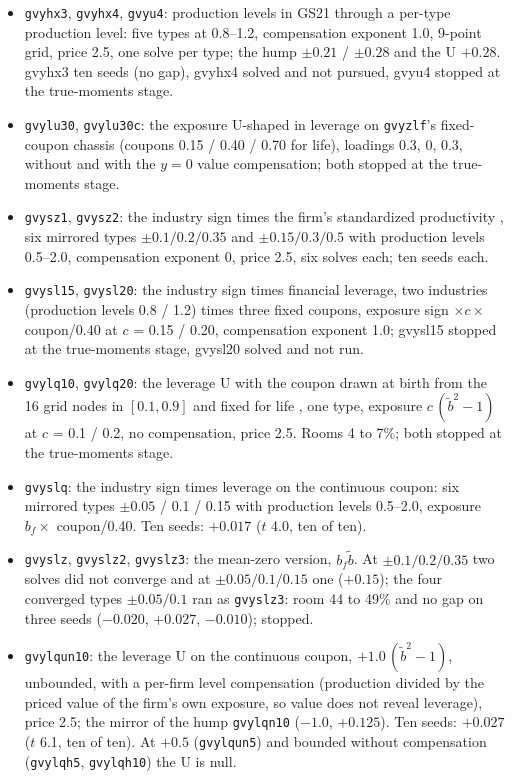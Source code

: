 \documentclass[11pt]{article}
\begin{document}
\begin{itemize}
\item \texttt{gvyhx3}, \texttt{gvyhx4}, \texttt{gvyu4}: production levels in GS21 through a per-type production level: five types at 0.8--1.2, compensation exponent 1.0, 9-point grid, price 2.5, one solve per type; the hump $\pm0.21$ / $\pm0.28$ and the U $+0.28$. gvyhx3 ten seeds (no gap), gvyhx4 solved and not pursued, gvyu4 stopped at the true-moments stage.
\item \texttt{gvylu30}, \texttt{gvylu30c}: the exposure U-shaped in leverage on \texttt{gvyzlf}'s fixed-coupon chassis (coupons 0.15 / 0.40 / 0.70 for life), loadings 0.3, 0, 0.3, without and with the $y = 0$ value compensation; both stopped at the true-moments stage.
\item \texttt{gvysz1}, \texttt{gvysz2}: the industry sign times the firm's standardized productivity , six mirrored types $\pm0.1/0.2/0.35$ and $\pm0.15/0.3/0.5$ with production levels 0.5--2.0, compensation exponent 0, price 2.5, six solves each; ten seeds each.
\item \texttt{gvysl15}, \texttt{gvysl20}: the industry sign times financial leverage, two industries (production levels 0.8 / 1.2) times three fixed coupons, exposure sign $\times c \times$ coupon/0.40 at $c$ = 0.15 / 0.20, compensation exponent 1.0; gvysl15 stopped at the true-moments stage, gvysl20 solved and not run.
\item \texttt{gvylq10}, \texttt{gvylq20}: the leverage U with the coupon drawn at birth from the 16 grid nodes in $[0.1, 0.9]$ and fixed for life , one type, exposure $c\,(\tilde b^2 - 1)$ at $c$ = 0.1 / 0.2, no compensation, price 2.5. Rooms 4 to 7\%; both stopped at the true-moments stage.
\item \texttt{gvyslq}: the industry sign times leverage on the continuous coupon: six mirrored types $\pm0.05$ / 0.1 / 0.15 with production levels 0.5--2.0, exposure $b_f \times$ coupon/0.40. Ten seeds: $+0.017$ ($t$ 4.0, ten of ten).
\item \texttt{gvyslz}, \texttt{gvyslz2}, \texttt{gvyslz3}: the mean-zero version, $b_f \tilde b$. At $\pm0.1/0.2/0.35$ two solves did not converge and at $\pm0.05/0.1/0.15$ one ($+0.15$); the four converged types $\pm0.05/0.1$ ran as \texttt{gvyslz3}: room 44 to 49\% and no gap on three seeds ($-0.020$, $+0.027$, $-0.010$); stopped.
\item \texttt{gvylqun10}: the leverage U on the continuous coupon, $+1.0\,(\tilde b^2 - 1)$, unbounded, with a per-firm level compensation (production divided by the priced value of the firm's own exposure, so value does not reveal leverage), price 2.5; the mirror of the hump \texttt{gvylqn10} ($-1.0$, $+0.125$). Ten seeds: $+0.027$ ($t$ 6.1, ten of ten). At $+0.5$ (\texttt{gvylqun5}) and bounded without compensation (\texttt{gvylqh5}, \texttt{gvylqh10}) the U is null.

\end{itemize}
\end{document}

